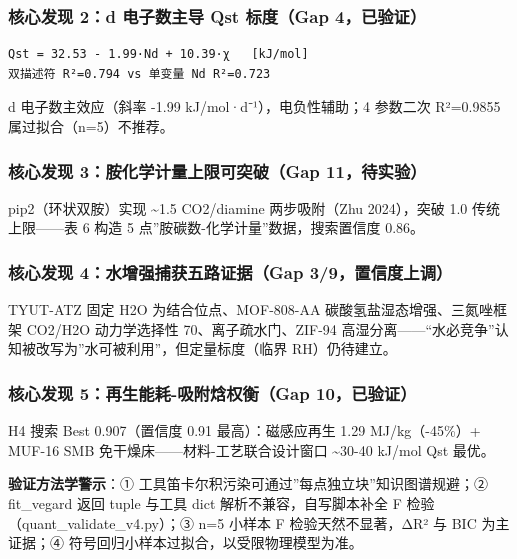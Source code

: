 \documentclass[12pt,a4paper]{ctexart}
\begin{document}
\subsubsection{核心发现 2：d 电子数主导 Qst 标度（Gap 4，已验证）}\label{ux6838ux5fc3ux53d1ux73b0-2d-ux7535ux5b50ux6570ux4e3bux5bfc-qst-ux6807ux5ea6gap-4ux5df2ux9a8cux8bc1}

\begin{verbatim}
Qst = 32.53 - 1.99·Nd + 10.39·χ   [kJ/mol]
双描述符 R²=0.794 vs 单变量 Nd R²=0.723
\end{verbatim}

d 电子数主效应（斜率 -1.99 kJ/mol·d⁻¹），电负性辅助；4 参数二次 R²=0.9855 属过拟合（n=5）不推荐。

\subsubsection{核心发现 3：胺化学计量上限可突破（Gap 11，待实验）}\label{ux6838ux5fc3ux53d1ux73b0-3ux80faux5316ux5b66ux8ba1ux91cfux4e0aux9650ux53efux7a81ux7834gap-11ux5f85ux5b9eux9a8c}

pip2（环状双胺）实现 \textasciitilde1.5 CO2/diamine 两步吸附（Zhu 2024），突破 1.0 传统上限------表 6 构造 5 点''胺碳数-化学计量''数据，搜索置信度 0.86。

\subsubsection{核心发现 4：水增强捕获五路证据（Gap 3/9，置信度上调）}\label{ux6838ux5fc3ux53d1ux73b0-4ux6c34ux589eux5f3aux6355ux83b7ux4e94ux8defux8bc1ux636egap-39ux7f6eux4fe1ux5ea6ux4e0aux8c03}

TYUT-ATZ 固定 H2O 为结合位点、MOF-808-AA 碳酸氢盐湿态增强、三氮唑框架 CO2/H2O 动力学选择性 70、离子疏水门、ZIF-94 高湿分离------``水必竞争''认知被改写为''水可被利用''，但定量标度（临界 RH）仍待建立。

\subsubsection{核心发现 5：再生能耗-吸附焓权衡（Gap 10，已验证）}\label{ux6838ux5fc3ux53d1ux73b0-5ux518dux751fux80fdux8017-ux5438ux9644ux7113ux6743ux8861gap-10ux5df2ux9a8cux8bc1}

H4 搜索 Best 0.907（置信度 0.91 最高）：磁感应再生 1.29 MJ/kg（-45\%）+ MUF-16 SMB 免干燥床------材料-工艺联合设计窗口 \textasciitilde30-40 kJ/mol Qst 最优。

\textbf{验证方法学警示}：① 工具笛卡尔积污染可通过''每点独立块''知识图谱规避；② fit\_vegard 返回 tuple 与工具 dict 解析不兼容，自写脚本补全 F 检验（quant\_validate\_v4.py）；③ n=5 小样本 F 检验天然不显著，ΔR² 与 BIC 为主证据；④ 符号回归小样本过拟合，以受限物理模型为准。
\end{document}
